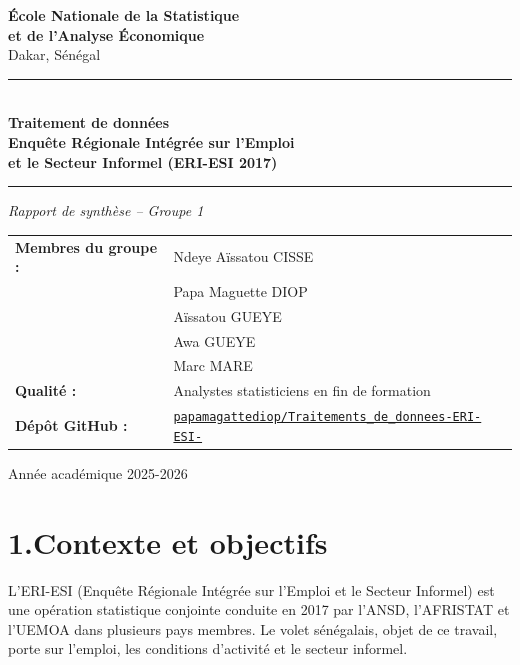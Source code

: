 \documentclass[12pt,a4paper]{article}
\begin{document}
\begin{titlepage}
\centering
\vspace*{1.5cm}

{\large \textbf{École Nationale de la Statistique\\et de l'Analyse Économique}}\\[0.3cm]
{\normalsize Dakar, Sénégal}

\vspace{2cm}
\rule{\linewidth}{0.5pt}\\[0.4cm]
{\LARGE \textbf{Traitement de données\\[0.3cm]
Enquête Régionale Intégrée sur l'Emploi\\
et le Secteur Informel (ERI-ESI 2017)}}\\[0.4cm]
\rule{\linewidth}{0.5pt}

\vspace{1.2cm}
{\large \textit{Rapport de synthèse -- Groupe 1}}

\vspace{2cm}
\begin{tabular}{ll}
\textbf{Membres du groupe :} & Ndeye Aïssatou CISSE \\
                              & Papa Maguette DIOP \\
                              & Aïssatou GUEYE \\
                              & Awa GUEYE \\
                              & Marc MARE \\[0.3cm]
\textbf{Qualité :}            & Analystes statisticiens en fin de formation \\[0.3cm]
\textbf{Dépôt GitHub :}       & \href{https://github.com/papamagattediop/Traitements\_de\_donnees-ERI-ESI-}%
                                {\texttt{papamagattediop/Traitements\_de\_donnees-ERI-ESI-}} \\
\end{tabular}

\vfill
{\normalsize Année académique 2025-2026}
\end{titlepage}

\section*{1.\quad Contexte et objectifs}

L'ERI-ESI (Enquête Régionale Intégrée sur l'Emploi et le Secteur Informel) est une
opération statistique conjointe conduite en 2017 par l'ANSD, l'AFRISTAT et l'UEMOA
dans plusieurs pays membres. Le volet sénégalais, objet de ce travail, porte sur
l'emploi, les conditions d'activité et le secteur informel.
\end{document}
